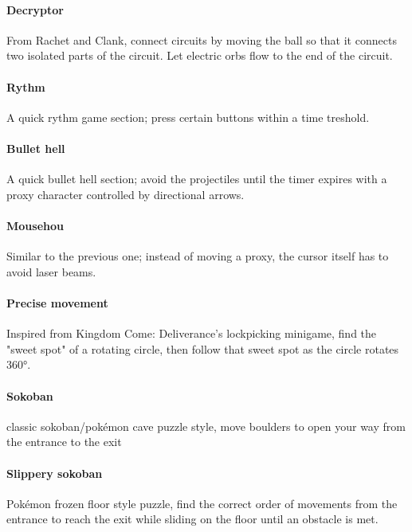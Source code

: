
\paragraph{Decryptor} From Rachet and Clank, connect circuits by moving the ball so that it connects two isolated parts of the circuit. Let electric orbs flow to the end of the circuit.


\paragraph{Rythm} A quick rythm game section; press certain buttons within a time treshold.

\paragraph{Bullet hell} A quick bullet hell section; avoid the projectiles until the timer expires with a proxy character controlled by directional arrows. 

\paragraph{Mousehou} Similar to the previous one; instead of moving a proxy, the cursor itself has to avoid laser beams.

\paragraph{Precise movement} Inspired from Kingdom Come: Deliverance's lockpicking minigame, find the "sweet spot" of a rotating circle, then follow that sweet spot as the circle rotates 360°.


\paragraph{Sokoban} classic sokoban/pokémon cave puzzle style, move boulders to open your way from the entrance to the exit


\paragraph{Slippery sokoban} Pokémon frozen floor style puzzle, find the correct order of movements from the entrance to reach the exit while sliding on the floor until an obstacle is met.

